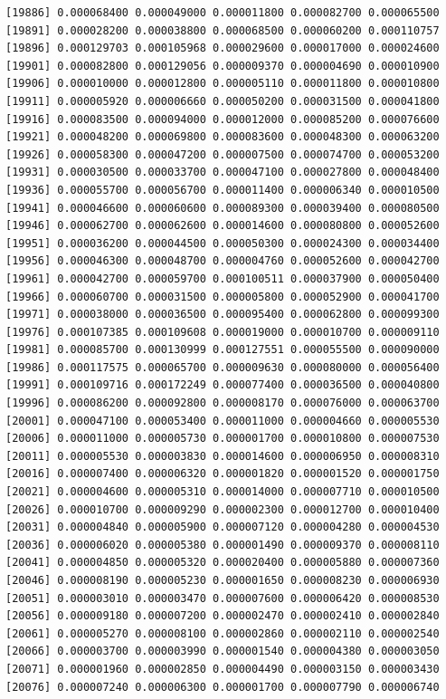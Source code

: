 \documentclass[]{article}
\begin{document}
\begin{verbatim}
[19886] 0.000068400 0.000049000 0.000011800 0.000082700 0.000065500
[19891] 0.000028200 0.000038800 0.000068500 0.000060200 0.000110757
[19896] 0.000129703 0.000105968 0.000029600 0.000017000 0.000024600
[19901] 0.000082800 0.000129056 0.000009370 0.000004690 0.000010900
[19906] 0.000010000 0.000012800 0.000005110 0.000011800 0.000010800
[19911] 0.000005920 0.000006660 0.000050200 0.000031500 0.000041800
[19916] 0.000083500 0.000094000 0.000012000 0.000085200 0.000076600
[19921] 0.000048200 0.000069800 0.000083600 0.000048300 0.000063200
[19926] 0.000058300 0.000047200 0.000007500 0.000074700 0.000053200
[19931] 0.000030500 0.000033700 0.000047100 0.000027800 0.000048400
[19936] 0.000055700 0.000056700 0.000011400 0.000006340 0.000010500
[19941] 0.000046600 0.000060600 0.000089300 0.000039400 0.000080500
[19946] 0.000062700 0.000062600 0.000014600 0.000080800 0.000052600
[19951] 0.000036200 0.000044500 0.000050300 0.000024300 0.000034400
[19956] 0.000046300 0.000048700 0.000004760 0.000052600 0.000042700
[19961] 0.000042700 0.000059700 0.000100511 0.000037900 0.000050400
[19966] 0.000060700 0.000031500 0.000005800 0.000052900 0.000041700
[19971] 0.000038000 0.000036500 0.000095400 0.000062800 0.000099300
[19976] 0.000107385 0.000109608 0.000019000 0.000010700 0.000009110
[19981] 0.000085700 0.000130999 0.000127551 0.000055500 0.000090000
[19986] 0.000117575 0.000065700 0.000009630 0.000080000 0.000056400
[19991] 0.000109716 0.000172249 0.000077400 0.000036500 0.000040800
[19996] 0.000086200 0.000092800 0.000008170 0.000076000 0.000063700
[20001] 0.000047100 0.000053400 0.000011000 0.000004660 0.000005530
[20006] 0.000011000 0.000005730 0.000001700 0.000010800 0.000007530
[20011] 0.000005530 0.000003830 0.000014600 0.000006950 0.000008310
[20016] 0.000007400 0.000006320 0.000001820 0.000001520 0.000001750
[20021] 0.000004600 0.000005310 0.000014000 0.000007710 0.000010500
[20026] 0.000010700 0.000009290 0.000002300 0.000012700 0.000010400
[20031] 0.000004840 0.000005900 0.000007120 0.000004280 0.000004530
[20036] 0.000006020 0.000005380 0.000001490 0.000009370 0.000008110
[20041] 0.000004850 0.000005320 0.000020400 0.000005880 0.000007360
[20046] 0.000008190 0.000005230 0.000001650 0.000008230 0.000006930
[20051] 0.000003010 0.000003470 0.000007600 0.000006420 0.000008530
[20056] 0.000009180 0.000007200 0.000002470 0.000002410 0.000002840
[20061] 0.000005270 0.000008100 0.000002860 0.000002110 0.000002540
[20066] 0.000003700 0.000003990 0.000001540 0.000004380 0.000003050
[20071] 0.000001960 0.000002850 0.000004490 0.000003150 0.000003430
[20076] 0.000007240 0.000006300 0.000001700 0.000007790 0.000006740

\end{verbatim}
\end{document}
